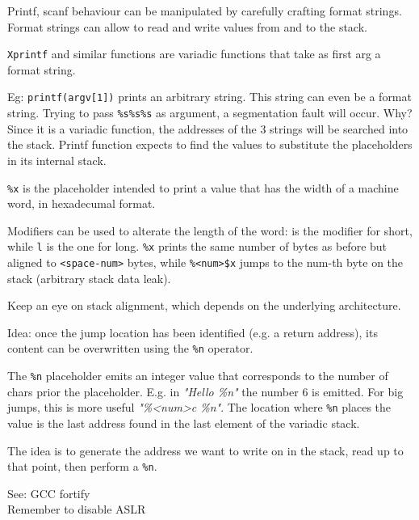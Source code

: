Printf, scanf behaviour can be manipulated by carefully crafting format strings.
Format strings can allow to read and write values from and to the stack.

\texttt{Xprintf} and similar functions are variadic functions that take as first arg a format string.

Eg: \texttt{printf(argv[1])} prints an arbitrary string. This string can even be a format string.
Trying to pass \texttt{\%s\%s\%s} as argument, a segmentation fault will occur.
Why? Since it is a variadic function, the addresses of the 3 strings will be searched into the stack.
Printf function expects to find the values to substitute the placeholders in its internal stack.

\texttt{\%x} is the placeholder intended to print a value that has the width of a machine word, in hexadecumal format.

Modifiers can be used to alterate the length of the word:  is the modifier for short, while \texttt{l} is the one for long.
\texttt{\%<space-num>x} prints the same number of bytes as before but aligned to \texttt{<space-num>} bytes, while \texttt{\%<num>\$<space-num>x} jumps to the num-th byte on the stack (arbitrary stack data leak).

Keep an eye on stack alignment, which depends on the underlying architecture.

Idea: once the jump location has been identified (e.g. a return address), its content can be overwritten using the \texttt{\%n} operator.

The \texttt{\%n} placeholder emits an integer value that corresponds to the number of chars prior the placeholder.
E.g. in \textit{"Hello \%n"} the number 6 is emitted. For big jumps, this is more useful \textit{"\%<num>c \%n"}.
The location where \texttt{\%n} places the value is the last address found in the last element of the variadic stack.

The idea is to generate the address we want to write on in the stack, read up to that point, then perform a \texttt{\%n}.

See: GCC fortify \\
Remember to disable ASLR